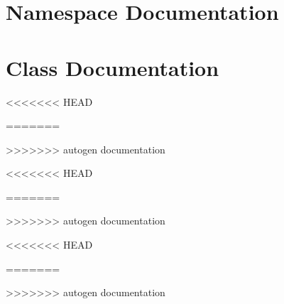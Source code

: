\documentclass[twoside]{book}
\newcommand{\+}{\discretionary{\mbox{\scriptsize$\hookleftarrow$}}{}{}}
\begin{document}
\chapter{Namespace Documentation}

\chapter{Class Documentation}












<<<<<<< HEAD












=======





















>>>>>>> autogen documentation




<<<<<<< HEAD


=======




>>>>>>> autogen documentation







<<<<<<< HEAD

=======



>>>>>>> autogen documentation





\end{document}

